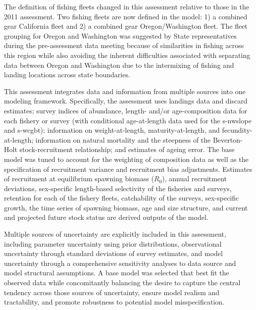 \documentclass[11pt,
  english,
  a4paper,
]{article}
\begin{document}
\leavevmode\tagmcend\tagstructend\par


The definition of fishing fleets changed in this assessment relative to those in the 2011 assessment. Two fishing fleets are now defined in the model: 1) a combined gear California fleet and 2) a combined gear Oregon/Washington fleet. The fleet grouping for Oregon and Washington was suggested by State representatives during the pre-assessment data meeting because of similarities in fishing across this region while also avoiding the inherent difficulties associated with separating data between Oregon and Washington due to the intermixing of fishing and landing locations across state boundaries.

\leavevmode\tagmcend\tagstructend\par


This assessment integrates data and information from multiple sources into one modeling framework. Specifically, the assessment uses landings data and discard estimates; survey indices of abundance, length- and/or age-composition data for each fishery or survey (with conditional age-at-length data used for the \gls{s-nwslope} and \gls{s-wcgbt}); information on weight-at-length, maturity-at-length, and fecundity-at-length; information on natural mortality and the steepness of the Beverton-Holt stock-recruitment relationship; and estimates of ageing error. The base model was tuned to account for the weighting of composition data as well as the specification of recruitment variance and recruitment bias adjustments. Estimates of recruitment at equilibrium spawning biomass ({\(R_0\)\leavevmode\tagmcend\tagstructend}), annual recruitment deviations, sex-specific length-based selectivity of the fisheries and surveys, retention for each of the fishery fleets, catchability of the surveys, sex-specific growth, the time series of spawning biomass, age and size structure, and current and projected future stock status are derived outputs of the model.

\leavevmode\tagmcend\tagstructend\par


Multiple sources of uncertainty are explicitly included in this assessment, including parameter uncertainty using prior distributions, observational uncertainty through standard deviations of survey estimates, and model uncertainty through a comprehensive sensitivity analyses to data source and model structural assumptions. A base model was selected that best fit the observed data while concomitantly balancing the desire to capture the central tendency across those sources of uncertainty, ensure model realism and tractability, and promote robustness to potential model misspecification.
\end{document}
